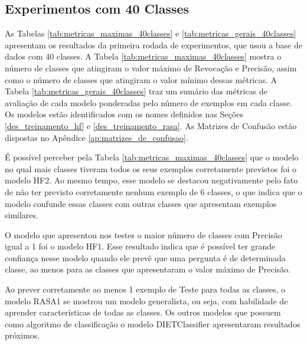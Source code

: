 \subsection{Experimentos com 40 Classes}
\label{res:experimentos_40classes}
As Tabelas \ref{tab:metricas_maximas_40classes} e \ref{tab:metricas_gerais_40classes} apresentam os resultados da primeira rodada de experimentos, que usou a base de dados com 40 classes. A Tabela \ref{tab:metricas_maximas_40classes} mostra o número de classes que atingiram o valor máximo de Revocação e Precisão, assim como o número de classes que atingiram o valor mínimo dessas métricas. A Tabela \ref{tab:metricas_gerais_40classes} traz um sumário das métricas de avaliação de cada modelo ponderadas pelo número de exemplos em cada classe. Os modelos estão identificados com os nomes definidos nas Seções \ref{des_treinamento_hf} e \ref{des_treinamento_rasa}. As Matrizes de Confusão estão dispostas no Apêndice \ref{ap:matrizes_de_confusao}.

É possível perceber pela Tabela \ref{tab:metricas_maximas_40classes} que o modelo no qual mais classes tiveram todos os seus exemplos corretamente previstos foi o modelo HF2. Ao mesmo tempo, esse modelo se destacou negativamente pelo fato de não ter previsto corretamente nenhum exemplo de 6 classes, o que indica que o modelo confunde essas classes com outras classes que apresentam exemplos similares.

O modelo que apresentou nos testes o maior número de classes com Precisão igual a 1 foi o modelo HF1. Esse resultado indica que é possível ter grande confiança nesse modelo quando ele prevê que uma pergunta é de determinada classe, ao menos para as classes que apresentaram o valor máximo de Precisão.

Ao prever corretamente ao menos 1 exemplo de Teste para todas as classes, o modelo RASA1 se mostrou um modelo generalista, ou seja, com habilidade de aprender características de todas as classes. Os outros modelos que possuem como algoritmo de classificação o modelo DIETClassifier apresentaram resultados próximos.

\begin{table}[!ht]
\centering
\caption{Número de classes que atingiram o valor máximo e o valor mínimo das métricas de avaliação (base de dados com 40 classes)}
\label{tab:metricas_maximas_40classes}
\end{table}


